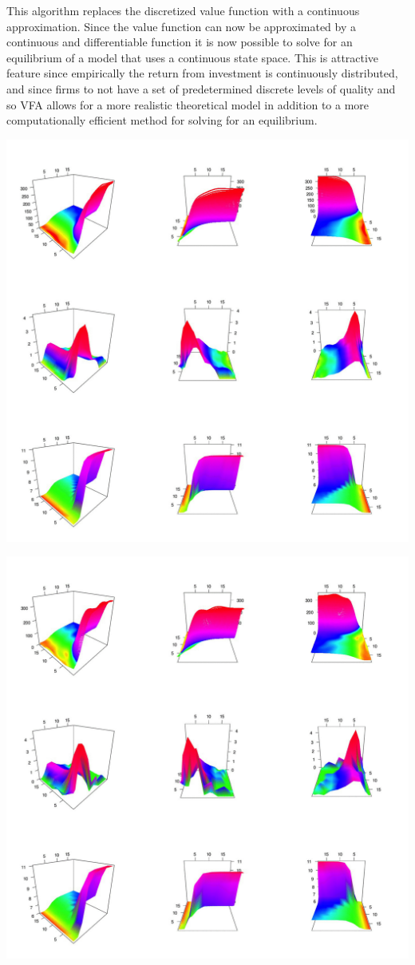 \documentclass[12pt]{article}
\begin{document}
This algorithm replaces the discretized value function with a continuous approximation. Since the value function can now be approximated by a continuous and differentiable function it is now possible to solve for an equilibrium of a model that uses a continuous state space. This is attractive feature since empirically the return from investment is continuously distributed, and since firms to not have a set of predetermined discrete levels of quality and so VFA allows for a more realistic theoretical model in addition to a more computationally efficient method for solving for an equilibrium.

\includegraphics{plot_cai_18_12_eqm}

\includegraphics{plot_cai_12_12_eqm}
\end{document}
